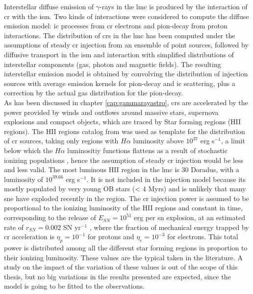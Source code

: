 \documentclass[main.tex]{subfiles}
\begin{document}
Interstellar diffuse emission of $\gamma$-rays in the \gls{lmc} is produced by the interaction of \gls{cr} with the \gls{ism}. Two kinds of interactions were considered to compute the diffuse emission model: \gls{ic} processes from \gls{cr} electrons and pion-decay from proton interactions. The distribution of \glspl{cr} in the \gls{lmc} has been computed under the assumptions of steady \gls{cr} injection from an ensemble of point sources, followed by diffusive transport in the \gls{ism} and interaction with simplified distributions of interstellar components (gas, photon and magnetic fields). The resulting interstellar emission model is obtained by convolving the distribution of injection sources with average emission kernels for pion-decay and \gls{ic} scattering, plus a correction by the actual gas distribution for the pion-decay.\\
As has been discussed in chapter \ref{cap:gammarayastro}, \glspl{cr} are accelerated by the power provided by winds and outflows around massive stars, supernova explosions and compact objects, which are traced by Star forming regions (HII regions). The HII regions catalog from \cite{2012HIIinLMC} was used as template for the distribution of \gls{cr} sources, taking only regions with $H\alpha$ luminosity above $10^{37}$ erg s$^{-1}$, a limit below which the $H\alpha$ luminositiy functions flattens as a result of stochastic ionizing populations \cite{Halphaluminosiyfunctions}, hence the assumption of steady \gls{cr} injection would be less and less valid. The most luminous HII region in the \gls{lmc} is 30 Doradus, with a luminosity of $10^{39.66}$ erg s$^{-1}$. It is not included in the injection model because its mostly populated by very young OB stars (< 4 Myrs) \cite{201130Doradusstarforming} and is unlikely that many \gls{sne} have exploded recently in the region. The \gls{cr} injection power is assumed to be proportional to the ionizing luminosity of the HII regions and constant in time, corresponding to the release of $E_{SN} = 10^{51}$ erg per \gls{sn} explosion, at an estimated rate of $r_{SN} =  0.002$ SN yr$^{-1}$ \cite{1991SNrates}, where the fraction of mechanical energy trapped by \gls{cr} acceleration is $\eta_{p} = 10^{-1}$ for protons and $\eta_{e} = 10^{-3}$ for electrons. This total power is distributed among all the different star forming regions in proportion to their ionizing luminosity. These values are the typical taken in the literature. A study on the impact of the variation of these values is out of the scope of this thesis, but no big variations in the results presented are expected, since the model is going to be fitted to the observations.
\end{document}
